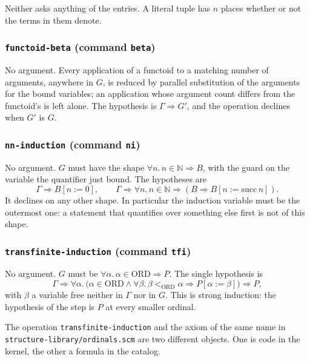 Neither asks anything of the entries.  A literal tuple has $n$ places
whether or not the terms in them denote.

\subsubsection*{\texttt{functoid-beta} (command \texttt{beta})}

No argument.  Every application of a functoid to a matching number of
arguments, anywhere in $G$, is reduced by parallel substitution of the
arguments for the bound variables; an application whose argument count
differs from the functoid's is left alone.  The hypothesis is
$\Gamma \Longrightarrow G'$, and the operation declines when $G'$ is $G$.

\subsubsection*{\texttt{nn-induction} (command \texttt{ni})}

No argument.  $G$ must have the shape
$\forall n.\, n \in \mathbb{N} \Rightarrow B$, with the guard on the
variable the quantifier just bound.  The hypotheses are
\[
  \Gamma \Longrightarrow B[n{:=}0],
  \qquad
  \Gamma \Longrightarrow \forall n.\, n \in \mathbb{N} \Rightarrow (B \Rightarrow B[n{:=}\mathrm{succ}\,n]).
\]
It declines on any other shape.  In particular the induction variable
must be the outermost one: a statement that quantifies over something
else first is not of this shape.

\subsubsection*{\texttt{transfinite-induction} (command \texttt{tfi})}

No argument.  $G$ must be
$\forall \alpha.\, \alpha \in \mathrm{ORD} \Rightarrow P$.  The single
hypothesis is
\[
  \Gamma \Longrightarrow
  \forall \alpha.\,
  \bigl(\alpha \in \mathrm{ORD} \wedge
        \forall \beta.\, \beta <_{\mathrm{ORD}} \alpha \Rightarrow P[\alpha{:=}\beta]\bigr)
  \Rightarrow P,
\]
with $\beta$ a variable free neither in $\Gamma$ nor in $G$.  This is
strong induction: the hypothesis of the step is $P$ at every smaller
ordinal.

\begin{remark}
The operation \texttt{transfinite-induction} and the axiom of the same
name in \texttt{structure-library/ordinals.scm} are two different
objects.  One is code in the kernel, the other a formula in the catalog.
\end{remark}

